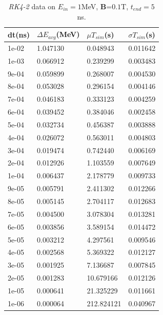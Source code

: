 \documentclass[a4paper,oneside,12pt]{report}
\numberwithin{equation}{chapter}
\begin{document}
{\begin{table}[H]
    \centering
    \caption{\textit{RK4-2} data on $E_{in}=1$MeV, \textbf{B}=$0.1$T, $t_{end}=5$ns.}
    \vspace{10pt}
    \begin{tabular}{|l|l|l|l|}
    \hline
    dt(ns)       & $\Delta E_{avg}$(MeV) & $\mu T_{sim}$(s)    & $\sigma T_{sim}$(s) \\\hline
        1e-02 & 1.047130     & 0.048943   & 0.011642 \\\hline
        1e-03 & 0.066912     & 0.239299   & 0.003483 \\\hline
        9e-04 & 0.059899     & 0.268007   & 0.004530 \\\hline
        8e-04 & 0.053028     & 0.296154   & 0.004146 \\\hline
        7e-04 & 0.046183     & 0.333123   & 0.004259 \\\hline
        6e-04 & 0.039452     & 0.384046   & 0.002458 \\\hline
        5e-04 & 0.032734     & 0.456387   & 0.003888 \\\hline
        4e-04 & 0.026072     & 0.563011   & 0.004803 \\\hline
        3e-04 & 0.019474     & 0.742440   & 0.006169 \\\hline
        2e-04 & 0.012926     & 1.103559   & 0.007649 \\\hline
        1e-04 & 0.006437     & 2.178779   & 0.009733 \\\hline
        9e-05 & 0.005791     & 2.411302   & 0.012266 \\\hline
        8e-05 & 0.005145     & 2.704117   & 0.012683 \\\hline
        7e-05 & 0.004500     & 3.078304   & 0.013281 \\\hline
        6e-05 & 0.003856     & 3.589154   & 0.014472 \\\hline
        5e-05 & 0.003212     & 4.297561   & 0.009546 \\\hline
        4e-05 & 0.002568     & 5.369322   & 0.012127 \\\hline
        3e-05 & 0.001925     & 7.136687   & 0.007845 \\\hline
        2e-05 & 0.001283     & 10.679166  & 0.012126 \\\hline
        1e-05 & 0.000641     & 21.325229  & 0.011661 \\\hline
        1e-06 & 0.000064     & 212.824121 & 0.040967 \\\hline
    \end{tabular}
    \label{tab:rk2_mag_table}
\end{table}

}
\end{document}
